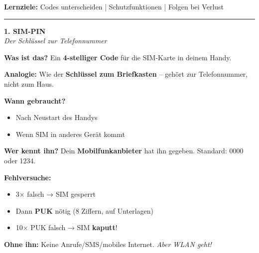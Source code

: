 \documentclass[a4paper,landscape,8pt]{extarticle}
\begin{document}

 \hfill
{\footnotesize\textbf{Lernziele:} Codes unterscheiden | Schutzfunktionen | Folgen bei Verlust}

\vspace{1mm}
\hrule
\vspace{1mm}

\begin{minipage}[t]{0.32\linewidth}
\begin{center}
\colorbox{simblue!10}{%
\begin{minipage}{0.95\linewidth}
\vspace{2mm}
\begin{center}
{\Large\bfseries\textcolor{simblue}{1. SIM-PIN}}\\[1pt]
{\footnotesize\itshape Der Schlüssel zur Telefonnummer}
\end{center}
\vspace{2mm}
\end{minipage}%
}
\end{center}

\vspace{1mm}

\textbf{Was ist das?} Ein \textbf{4-stelliger Code} für die SIM-Karte in deinem Handy.

\textbf{Analogie:} Wie der \textbf{Schlüssel zum Briefkasten} -- gehört zur Telefonnummer, nicht zum Haus.

\textbf{Wann gebraucht?}
\begin{itemize}
\item Nach Neustart des Handys
\item Wenn SIM in anderes Gerät kommt
\end{itemize}

\textbf{Wer kennt ihn?} Dein \textbf{Mobilfunkanbieter} hat ihn gegeben. Standard: 0000 oder 1234.

\textbf{Fehlversuche:}
\begin{itemize}
\item 3× falsch → SIM gesperrt
\item Dann \textbf{PUK} nötig (8 Ziffern, auf Unterlagen)
\item 10× PUK falsch → SIM \textbf{kaputt}!
\end{itemize}

\textbf{Ohne ihn:} Keine Anrufe/SMS/mobiles Internet. \textit{Aber WLAN geht!}

\end{minipage}%
\end{document}

